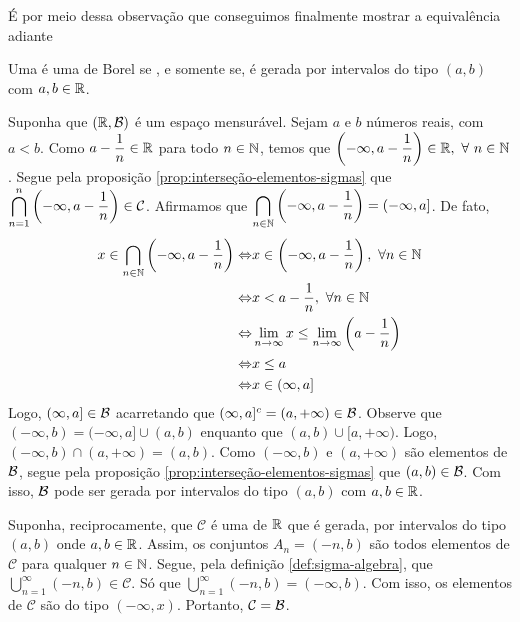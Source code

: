 É por meio dessa observação que conseguimos finalmente mostrar a equivalência adiante\\
\begin{theorem}
\label{teo:equiv-borel}
    Uma \sigal é uma de Borel  se , e somente se, é gerada por intervalos do tipo $(a,b)$ com $a,b \in \mathbb{R}$.
\end{theorem}

\begin{prova}
   Suponha que $(\mathbb{R},\operatorname{\mathcal{B}})$ é um espaço mensurável. 
   Sejam $a$ e $b$ números reais, com $a<b$.
   Como $a - \dfrac{1}{n} \in \mathbb{R}$ para todo $n \in \operatorname{\mathbb{N}}$, temos que 
   $\left(-\infty, a- \dfrac{1}{n}\right) \in \R, \ \forall \ n \in \N$.
   Segue pela proposição \ref{prop:interseção-elementos-sigmas} que
   $\displaystyle \bigcap_{n = 1}^n \left(-\infty, a- \dfrac{1}{n}\right) \in \operatorname{\mathcal{C}}$.
   Afirmamos que 
   $\displaystyle \bigcap_{n \in \operatorname{\mathbb{N}}} \left(-\infty, a - \dfrac{1}{n}\right) = (-\infty, a]$. 
   De fato,
   \begin{align*}
   		x \in \bigcap_{n \in \operatorname{\mathbb{N}}} \left(-\infty, a - \dfrac{1}{n}\right)
   		\Leftrightarrow & x \in \left(-\infty, a - \dfrac{1}{n}\right), \ \forall n \in \operatorname{\mathbb{N}}\\
   		\Leftrightarrow & x < a - \dfrac{1}{n}, \ \forall n \in \operatorname{\mathbb{N}}\\
   		\Leftrightarrow & \displaystyle \lim_{n \to \infty} x \leq \displaystyle \lim_{n \to \infty} \left(a - \dfrac{1}{n}\right)\\
   		\Leftrightarrow & x \leq a\\
   		\Leftrightarrow & x \in (\infty, a]\\
   \end{align*}
	Logo, $(\infty, a] \in \operatorname{\mathcal{B}}$ acarretando que $(\infty, a]^c = (a, +\infty) \in \operatorname{\mathcal{B}}$.
	Observe que $(-\infty, b) = (-\infty,a] \cup (a, b)$ enquanto que $(a, b) \cup [a, +\infty)$.
	Logo, $(-\infty, b) \cap (a, +\infty) = (a,b)$. 
	Como $(-\infty, b)$ e $(a, +\infty)$ são elementos de $\operatorname{\mathcal{B}}$, segue pela proposição
	\ref{prop:interseção-elementos-sigmas} que $(a,b) \in \operatorname{\mathcal{B}}$.
	Com isso, $\operatorname{\mathcal{B}}$ pode ser gerada por intervalos do tipo $(a,b)$ com $a,b \in \mathbb{R}$.
   
	Suponha, reciprocamente, que $\mathcal{C}$ é uma \sigal de $\mathbb{R}$ que é gerada, por intervalos do tipo $(a,b)$ onde $a,b \in \mathbb{R}$.
	Assim, os conjuntos $A_n = (-n, b)$ são todos elementos de $\mathcal{C}$ para qualquer $n \in \operatorname{\mathbb{N}}$.
	Segue, pela definição \ref{def:sigma-algebra}, que 
	$\displaystyle \bigcup_{n = 1}^\infty (-n,b) \in \mathcal{C}$.
	Só que $\displaystyle \bigcup_{n = 1}^\infty (-n,b) = (-\infty, b)$.
	Com isso, os elementos de $\mathcal{C}$ são do tipo $(-\infty, x)$.
	Portanto, $\mathcal{C} = \operatorname{\mathcal{B}}$.

\end{prova}

